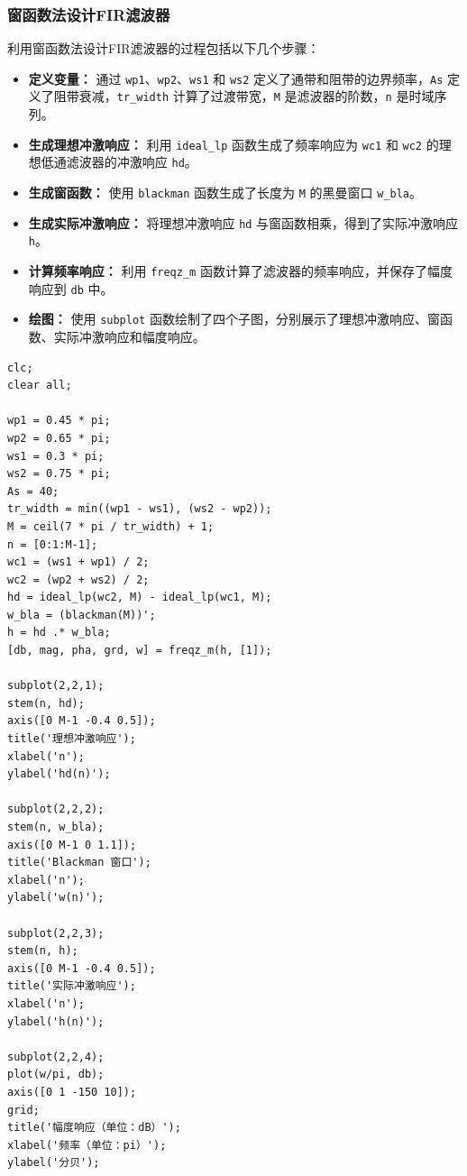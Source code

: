 \documentclass[a4paper,12pt]{article}
\begin{document}
\subsubsection{窗函数法设计FIR滤波器}
利用窗函数法设计FIR滤波器的过程包括以下几个步骤：

\begin{itemize}
    \item \textbf{定义变量：} 通过 \texttt{wp1}、\texttt{wp2}、\texttt{ws1} 和 \texttt{ws2} 定义了通带和阻带的边界频率，\texttt{As} 定义了阻带衰减，\texttt{tr\_width} 计算了过渡带宽，\texttt{M} 是滤波器的阶数，\texttt{n} 是时域序列。
    
    \item \textbf{生成理想冲激响应：} 利用 \texttt{ideal\_lp} 函数生成了频率响应为 \texttt{wc1} 和 \texttt{wc2} 的理想低通滤波器的冲激响应 \texttt{hd}。
    
    \item \textbf{生成窗函数：} 使用 \texttt{blackman} 函数生成了长度为 \texttt{M} 的黑曼窗口 \texttt{w\_bla}。
    
    \item \textbf{生成实际冲激响应：} 将理想冲激响应 \texttt{hd} 与窗函数相乘，得到了实际冲激响应 \texttt{h}。
    
    \item \textbf{计算频率响应：} 利用 \texttt{freqz\_m} 函数计算了滤波器的频率响应，并保存了幅度响应到 \texttt{db} 中。
    
    \item \textbf{绘图：} 使用 \texttt{subplot} 函数绘制了四个子图，分别展示了理想冲激响应、窗函数、实际冲激响应和幅度响应。
\end{itemize}

\begin{lstlisting}
clc;
clear all;

wp1 = 0.45 * pi;
wp2 = 0.65 * pi;
ws1 = 0.3 * pi;
ws2 = 0.75 * pi;
As = 40;
tr_width = min((wp1 - ws1), (ws2 - wp2));
M = ceil(7 * pi / tr_width) + 1;
n = [0:1:M-1];
wc1 = (ws1 + wp1) / 2;
wc2 = (wp2 + ws2) / 2;
hd = ideal_lp(wc2, M) - ideal_lp(wc1, M);
w_bla = (blackman(M))'; 
h = hd .* w_bla;
[db, mag, pha, grd, w] = freqz_m(h, [1]); 

subplot(2,2,1);
stem(n, hd);
axis([0 M-1 -0.4 0.5]); 
title('理想冲激响应');
xlabel('n'); 
ylabel('hd(n)'); 

subplot(2,2,2);
stem(n, w_bla);
axis([0 M-1 0 1.1]);
title('Blackman 窗口');
xlabel('n');
ylabel('w(n)');

subplot(2,2,3);
stem(n, h);
axis([0 M-1 -0.4 0.5]);
title('实际冲激响应');
xlabel('n');
ylabel('h(n)');

subplot(2,2,4);
plot(w/pi, db);
axis([0 1 -150 10]); 
grid; 
title('幅度响应（单位：dB）');
xlabel('频率（单位：pi）');
ylabel('分贝');

\end{lstlisting}
\end{document}
